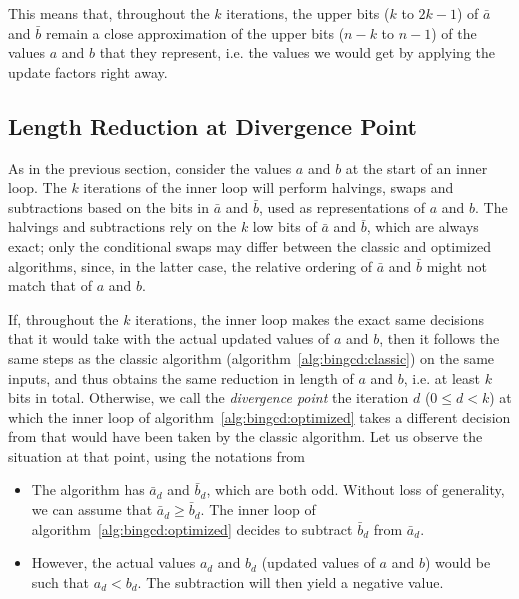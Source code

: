 \documentclass{llncs}
\begin{document}
This means that, throughout the $k$ iterations, the upper bits ($k$ to
$2k-1$) of $\bar a$ and $\bar b$ remain a close approximation of the
upper bits ($n-k$ to $n-1$) of the values $a$ and $b$ that they
represent, i.e. the values we would get by applying the update factors
right away.

\subsection{Length Reduction at Divergence Point}\label{sec:iterbound:diverge}

As in the previous section, consider the values $a$ and $b$ at the start
of an inner loop. The $k$ iterations of the inner loop will perform
halvings, swaps and subtractions based on the bits in $\bar a$ and $\bar
b$, used as representations of $a$ and $b$. The halvings and
subtractions rely on the $k$ low bits of $\bar a$ and $\bar b$, which
are always exact; only the conditional swaps may differ between the
classic and optimized algorithms, since, in the latter case, the
relative ordering of $\bar a$ and $\bar b$ might not match that of $a$
and $b$.

If, throughout the $k$ iterations, the inner loop makes the exact same
decisions that it would take with the actual updated values of $a$ and
$b$, then it follows the same steps as the classic algorithm
(algorithm~\ref{alg:bingcd:classic}) on the same inputs, and thus
obtains the same reduction in length of $a$ and $b$, i.e. at least $k$
bits in total. Otherwise, we call the \emph{divergence point} the
iteration $d$ ($0\leq d < k$) at which the inner loop of
algorithm~\ref{alg:bingcd:optimized} takes a different decision from
that would have been taken by the classic algorithm. Let us observe the
situation at that point, using the notations from

\begin{itemize}

    \item The algorithm has $\bar a_d$ and $\bar b_d$, which are both odd.
    Without loss of generality, we can assume that $\bar a_d \geq \bar b_d$.
    The inner loop of algorithm~\ref{alg:bingcd:optimized} decides to
    subtract $\bar b_d$ from $\bar a_d$.

    \item However, the actual values $a_d$ and $b_d$ (updated values of
    $a$ and $b$) would be such that $a_d < b_d$. The subtraction will
    then yield a negative value.

\end{itemize}
\end{document}
